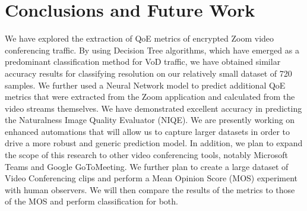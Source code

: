 \section{Conclusions and Future Work}
We have explored the extraction of QoE metrics of encrypted Zoom video conferencing traffic. By using Decision Tree algorithms, which have emerged as a predominant classification method for VoD traffic, we have obtained similar accuracy results for classifying resolution on our relatively small dataset of 720 samples. We further used a Neural Network model to predict additional QoE metrics that were extracted from the Zoom application and calculated from the video streams themselves. We have demonstrated excellent accuracy in predicting the Naturalness Image Quality Evaluator (NIQE). We are presently working on enhanced automations that will allow us to capture larger datasets in order to drive a more robust and generic prediction model. In addition, we plan to expand the scope of this research to other video conferencing tools, notably Microsoft Teams and Google GoToMeeting. We further plan to create a large dataset of Video Conferencing clips and perform a Mean Opinion Score (MOS) experiment with human observers. We will then compare the results of the metrics to those of the MOS and perform classification for both. 